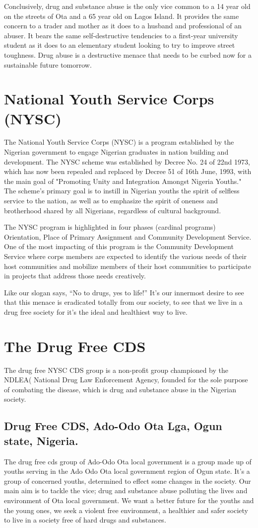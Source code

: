 \documentclass{report}
\begin{document}
Conclusively, drug and substance abuse is the only vice common to a 14 year old on the streets of Ota and a 65 year old on Lagos Island. It provides the same concern to a trader and mother as it does to a husband and professional of an abuser. It bears the same self-destructive tendencies to a first-year university student as it does to an elementary student looking to try to improve street toughness. Drug abuse is a destructive menace that needs to be curbed now for a sustainable future tomorrow.

\section{National Youth Service Corps (NYSC)}
The National Youth Service Corps (NYSC) is a program established by the Nigerian government to engage Nigerian graduates in nation building and development. The NYSC scheme was established by Decree No. 24 of 22nd 1973, which has now been repealed and replaced by Decree 51 of 16th June, 1993, with the main goal of "Promoting Unity and Integration Amongst Nigeria Youths." The scheme's primary goal is to instill in Nigerian youths the spirit of selfless service to the nation, as well as to emphasize the spirit of oneness and brotherhood shared by all Nigerians, regardless of cultural background.

The NYSC program is highlighted in four phases (cardinal programs) Orientation, Place of Primary Assignment and Community Development Service. One of the most impacting of this program is the Community Development Service where corps members are expected to identify the various needs of their host communities and mobilize members of their host communities to participate in projects that address those needs creatively.

Like our slogan says, “No to drugs, yes to life!” It’s our innermost desire to see that this menace is eradicated totally from our society, to see that we live in a drug free society for it’s the ideal and healthiest way to live. 

\section{The Drug Free CDS}
The drug free NYSC CDS group is a non-profit group championed by the NDLEA( National Drug Law Enforcement  Agency, founded for the sole purpose of combating the disease, which is drug and substance abuse in the Nigerian society.

\subsection{Drug Free CDS, Ado-Odo Ota Lga, Ogun state, Nigeria.}
The drug free cds group of Ado-Odo Ota local government is a group made up of youths serving in the Ado Odo Ota local government region of Ogun state. It’s a group of concerned youths, determined to effect some changes in the society. Our main aim is to tackle the vice; drug and substance abuse polluting the lives and environment of Ota local government. We want a better future for the youths and the young ones, we seek a violent free environment, a healthier and safer society to live in a society free of hard drugs and substances.
\end{document}
